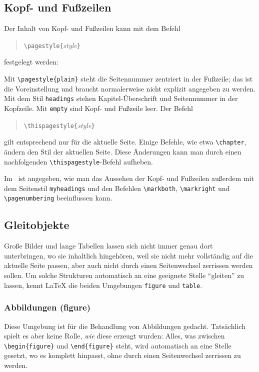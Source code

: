 \subsection{Kopf- und Fußzeilen} 
Der Inhalt von Kopf- und  Fußzeilen kann mit dem Befehl
\begin{verse}
\verb|\pagestyle{|\textit{style}\verb|}|
\end{verse}
festgelegt werden:
 
Mit \verb|\pagestyle{plain}| steht
die Seitennummer zentriert in der Fußzeile; 
das ist die Voreinstellung und braucht normalerweise nicht explizit 
angegeben zu werden.
Mit dem Stil \texttt{headings} stehen Kapitel-Überschrift und
Seitennummer in der Kopfzeile.
Mit \texttt{empty} sind Kopf- und Fußzeile leer.  Der Befehl
\begin{verse}
\verb|\thispagestyle{|\textit{style}\verb|}|
\end{verse}
gilt entsprechend nur für die aktuelle Seite.  Einige Befehle, wie etwa
\verb|\chapter|, ändern den Stil der aktuellen Seite.  Diese Änderungen 
kann man durch einen nachfolgenden \verb|\thispagestyle|-Befehl aufheben.

\begin{sloppypar}%
\relax %
Im \manual\ ist angegeben, wie man das Aussehen der Kopf- und Fußzeilen
außerdem mit dem Seitenstil 
\verb|myheadings| und den Befehlen
\verb|\markboth|,
\verb|\markright| und
\verb|\pagenumbering|
beeinflussen kann.
\end{sloppypar}

\subsection{Gleitobjekte} \label{floats}
Große Bilder und lange Tabellen lassen sich nicht immer genau 
dort unterbringen, wo sie inhaltlich hingehören, weil sie nicht mehr 
vollständig auf die aktuelle Seite passen, aber auch nicht durch einen 
Seitenwechsel zerrissen werden sollen.  Um  solche Strukturen automatisch
an eine geeignete Stelle "`gleiten"' zu lassen, kennt \LaTeX{} die beiden 
Umgebungen \texttt{figure} und \texttt{table}.  

\subsubsection{Abbildungen (figure)}
Diese Umgebung ist für die Behandlung von Abbildungen gedacht.
Tatsächlich spielt es aber keine Rolle, \emph{wie} diese erzeugt wurden:
Alles, was zwischen
\verb|\begin{figure}| und \verb|\end{figure}|
steht, wird automatisch an eine Stelle
gesetzt, wo es komplett hinpasst, ohne durch einen Seitenwechsel
zerrissen zu werden.  

